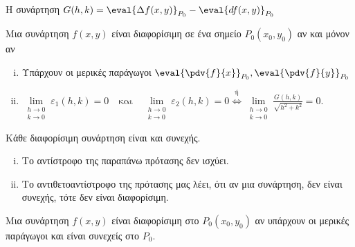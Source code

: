 \documentclass[a4paper,table]{report}
\begin{document}
\begin{rem}
\item {}
  Η συνάρτηση $ G(h,k) = \eval{\Delta f(x,y)}_{P_{0}} - \eval{df(x,y)}_{P_{0}} $
\end{rem}

\begin{dfn}[Επαναδιατύπωση]
\item {}
  Μια συνάρτηση $ f(x,y) $ είναι \textcolor{Col1}{διαφορίσιμη} σε ένα σημείο 
  $ P_{0}(x_{0}, y_{0}) $ αν και μόνον αν
  \begin{enumerate}[i)]
    \item Υπάρχουν οι μερικές παράγωγοι $ \eval{\pdv{f}{x}}_{P_{0}},
      \eval{\pdv{f}{y}}_{P_{0}} $
    \item $ \lim\limits_{\substack{h\to 0 \\k \to 0}} \varepsilon _{1}(h,k) = 
      0 \quad \text{και} \quad \lim\limits_{\substack{h\to 0 \\k \to 0}} 
      \varepsilon _{2}(h,k)=0 \overset{\text{ή}}{\Leftrightarrow} 
      \lim\limits_{\substack{h\to 0 \\k \to 0}} 
      \frac{G(h,k)}{\sqrt{h^{2}+k^{2}}} = 0 $.
  \end{enumerate}
\end{dfn}

\begin{prop}
  Κάθε διαφορίσιμη συνάρτηση είναι και συνεχής.
\end{prop}

\begin{rem}
\item {}
  \begin{enumerate}[i)]
    \item Το αντίστροφο της παραπάνω πρότασης δεν ισχύει.
    \item Το αντιθετοαντίστροφο της πρότασης μας λέει, ότι αν μια συνάρτηση, 
      δεν είναι συνεχής, τότε δεν είναι διαφορίσιμη.
  \end{enumerate}
\end{rem}

\begin{thm}
\item {}
  Μια συνάρτηση $ f(x,y) $ είναι διαφορίσιμη στο $ P_{0}(x_{0}, y_{0}) $ 
  αν υπάρχουν οι μερικές παράγωγοι και είναι συνεχείς στο $ P_{0} $.
\end{thm}
\end{document}
